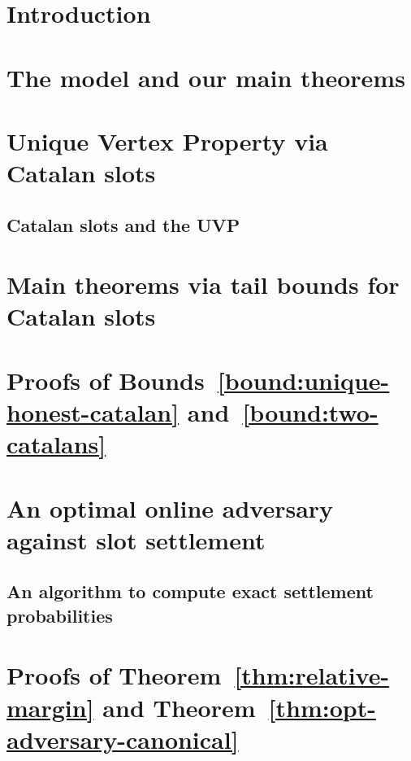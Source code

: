 \documentclass{article}
\theoremstyle{definition}
\begin{document}

\section{Introduction}


\section{The model and our main theorems}\label{sec:model}


\section{Unique Vertex Property via Catalan slots}\label{sec:definitions}


\subsection{Catalan slots and the UVP}\label{sec:catalan-uvp}



\section{Main theorems via tail bounds for Catalan slots}\label{sec:bounds-main-proofs}


\section{Proofs of Bounds~\ref{bound:unique-honest-catalan} and~\ref{bound:two-catalans}}\label{sec:estimates}


\section{An optimal online adversary against slot settlement}
\label{sec:recursion}

\subsection{An algorithm to compute exact settlement probabilities}
\label{sec:exact-prob}


\section{Proofs of Theorem~\ref{thm:relative-margin} and Theorem~\ref{thm:opt-adversary-canonical}}
\label{sec:margin-proof}

\end{document}

